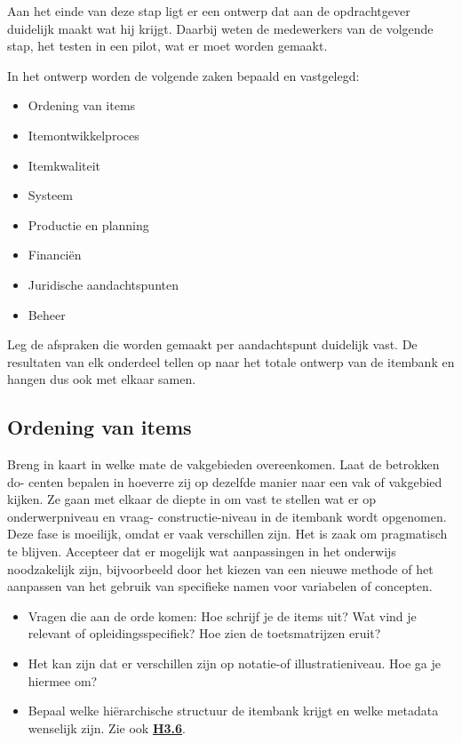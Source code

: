 \documentclass[
]{book}
\providecommand{\tightlist}{%
  \setlength{\itemsep}{0pt}\setlength{\parskip}{0pt}}
\begin{document}
Aan het einde van deze stap ligt er een ontwerp dat aan de opdrachtgever duidelijk maakt wat hij krijgt. Daarbij weten de medewerkers van de volgende stap, het testen in een pilot, wat er moet worden gemaakt.

In het ontwerp worden de volgende zaken bepaald en vastgelegd:

\begin{itemize}
\tightlist
\item
  Ordening van items
\item
  Itemontwikkelproces
\item
  Itemkwaliteit
\item
  Systeem
\item
  Productie en planning
\item
  Financiën
\item
  Juridische aandachtspunten
\item
  Beheer
\end{itemize}

Leg de afspraken die worden gemaakt per aandachtspunt duidelijk vast. De resultaten van elk onderdeel tellen op naar het totale ontwerp van de itembank en hangen dus ook met elkaar samen.

\hypertarget{ordening-van-items}{%
\subsection{Ordening van items}\label{ordening-van-items}}

Breng in kaart in welke mate de vakgebieden overeenkomen. Laat de betrokken do- centen bepalen in hoeverre zij op dezelfde manier naar een vak of vakgebied kijken. Ze gaan met elkaar de diepte in om vast te stellen wat er op onderwerpniveau en vraag- constructie-niveau in de itembank wordt opgenomen. Deze fase is moeilijk, omdat er vaak verschillen zijn. Het is zaak om pragmatisch te blijven. Accepteer dat er mogelijk wat aanpassingen in het onderwijs noodzakelijk zijn, bijvoorbeeld door het kiezen van een nieuwe methode of het aanpassen van het gebruik van specifieke namen voor variabelen of concepten.

\begin{itemize}
\tightlist
\item
  Vragen die aan de orde komen: Hoe schrijf je de items uit? Wat vind je relevant of opleidingsspecifiek? Hoe zien de toetsmatrijzen eruit?
\item
  Het kan zijn dat er verschillen zijn op notatie-of illustratieniveau. Hoe ga je hiermee om?
\item
  Bepaal welke hiërarchische structuur de itembank krijgt en welke metadata wenselijk zijn. Zie ook \textbf{\protect\hyperlink{de-ordening-van-een-itembank}{H3.6}}.
\end{itemize}
\end{document}
